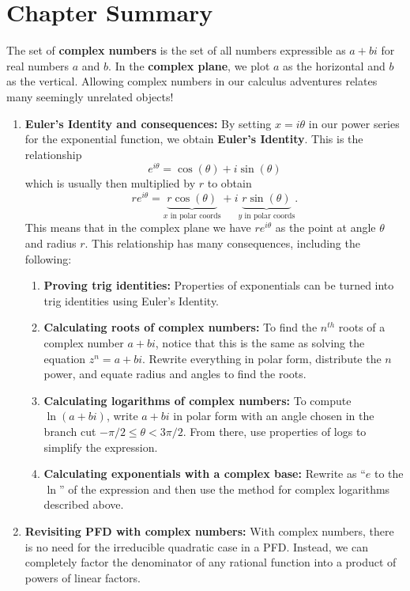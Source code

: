 \section{Chapter Summary}
The set of {\bf complex numbers} is the set of all numbers expressible as $a+bi$ for real numbers $a$ and $b$.  In the {\bf complex plane}, we plot $a$ as the horizontal and $b$ as the vertical. Allowing complex numbers in our calculus adventures relates many seemingly unrelated objects!  

\begin{enumerate}
\item {\bf Euler's Identity and consequences:} By setting $x=i\theta$ in our power series for the exponential function, we obtain {\bf Euler's Identity}.  This is the relationship $$e^{i\theta}=\cos\left(\theta\right)+i\sin\left(\theta\right)$$ which is usually then multiplied by $r$ to obtain
$$re^{i\theta}=\underset{x\text{ in polar coords}}{\underbrace{r\cos\left(\theta\right)}}+i\underset{y\text{ in polar coords}}{\underbrace{r\sin\left(\theta\right)}}.$$  This means that in the complex plane we have $re^{i\theta}$ as the point at angle $\theta$ and radius $r$.  This relationship has many consequences, including the following:
\begin{enumerate}
\item {\bf Proving trig identities:} Properties of exponentials can be turned into trig identities using Euler's Identity.
\item {\bf Calculating roots of complex numbers:} To find the $n^{th}$ roots of a complex number $a+bi$, notice that this is the same as solving the equation $z^n=a+bi.$  Rewrite everything in polar form, distribute the $n$ power, and equate radius and angles to find the roots. 
\item {\bf Calculating logarithms of complex numbers:} To compute $\ln\left(a+bi\right)$, write $a+bi$ in polar form with an angle chosen in the branch cut $-\pi/2\leq \theta<3\pi/2$.  From there, use properties of logs to simplify the expression.
\item {\bf Calculating exponentials with a complex base:} Rewrite as ``$e$ to the $\ln$'' of the expression and then use the method for complex logarithms described above.
\end{enumerate}
\item {\bf Revisiting PFD with complex numbers:} With complex numbers, there is no need for the irreducible quadratic case in a PFD.  Instead, we can completely factor the denominator of any rational function into a product of powers of linear factors.
\end{enumerate}